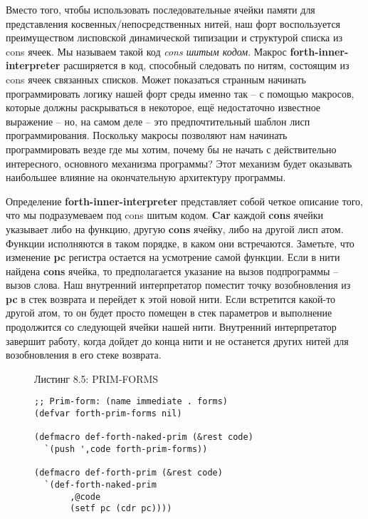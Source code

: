 Вместо того, чтобы использовать последовательные ячейки памяти для представления косвенных/непосредственных нитей, наш форт воспользуется преимуществом лисповской динамической типизации и структурой списка из cons ячеек. Мы называем такой код \emph{cons шитым кодом}. Макрос \textbf{forth-inner-interpreter} расширяется в код, способный следовать по нитям, состоящим из cons ячеек связанных списков. Может показаться странным начинать программировать логику нашей форт среды именно так -- с помощью макросов, которые должны раскрываться в некоторое, ещё недостаточно известное выражение -- но, на самом деле -- это предпочтительный шаблон лисп программирования. Поскольку макросы позволяют нам начинать программировать везде где мы хотим, почему бы не начать с действительно интересного, основного механизма программы? Этот механизм будет оказывать наибольшее влияние на окончательную архитектуру программы.

Определение \textbf{forth-inner-interpreter} представляет собой четкое описание того, что мы подразумеваем под cons шитым кодом. \textbf{Car} каждой \textbf{cons} ячейки указывает либо на функцию, другую \textbf{cons} ячейку, либо на другой лисп атом. Функции исполняются в таком порядке, в каком они встречаются. Заметьте, что изменение \textbf{pc} регистра остается на усмотрение самой функции. Если в нити найдена \textbf{cons} ячейка, то предполагается указание на вызов подпрограммы -- вызов слова. Наш внутренний интерпретатор поместит точку возобновления из \textbf{pc} в стек возврата и перейдет к этой новой нити. Если встретится какой-то другой атом, то он будет просто помещен в стек параметров и выполнение продолжится со следующей ячейки нашей нити. Внутренний интерпретатор завершит работу, когда дойдет до конца нити и не останется других нитей для возобновления в его стеке возврата.

\begin{figure}Листинг 8.5: PRIM-FORMS\label{listing_8.5}
  \listbegin
\begin{verbatim}
;; Prim-form: (name immediate . forms)
(defvar forth-prim-forms nil)

(defmacro def-forth-naked-prim (&rest code)
  `(push ',code forth-prim-forms))

(defmacro def-forth-prim (&rest code)
  `(def-forth-naked-prim
       ,@code
       (setf pc (cdr pc))))
\end{verbatim}
  \listend
\end{figure}

